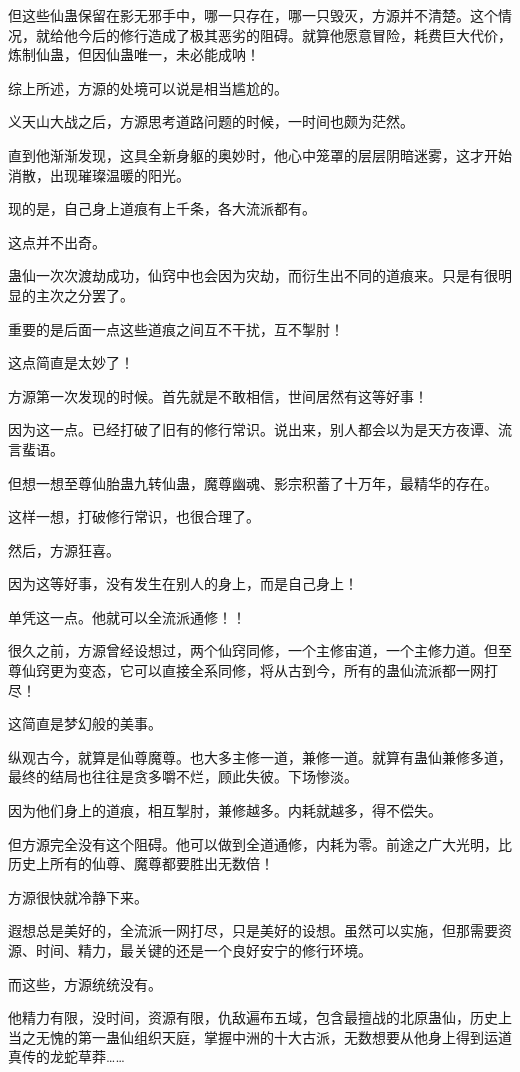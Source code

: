 \begin{this_body}
但这些仙蛊保留在影无邪手中，哪一只存在，哪一只毁灭，方源并不清楚。这个情况，就给他今后的修行造成了极其恶劣的阻碍。就算他愿意冒险，耗费巨大代价，炼制仙蛊，但因仙蛊唯一，未必能成呐！

综上所述，方源的处境可以说是相当尴尬的。

义天山大战之后，方源思考道路问题的时候，一时间也颇为茫然。

直到他渐渐发现，这具全新身躯的奥妙时，他心中笼罩的层层阴暗迷雾，这才开始消散，出现璀璨温暖的阳光。

现的是，自己身上道痕有上千条，各大流派都有。

这点并不出奇。

蛊仙一次次渡劫成功，仙窍中也会因为灾劫，而衍生出不同的道痕来。只是有很明显的主次之分罢了。

重要的是后面一点这些道痕之间互不干扰，互不掣肘！

这点简直是太妙了！

方源第一次发现的时候。首先就是不敢相信，世间居然有这等好事！

因为这一点。已经打破了旧有的修行常识。说出来，别人都会以为是天方夜谭、流言蜚语。

但想一想至尊仙胎蛊九转仙蛊，魔尊幽魂、影宗积蓄了十万年，最精华的存在。

这样一想，打破修行常识，也很合理了。

然后，方源狂喜。

因为这等好事，没有发生在别人的身上，而是自己身上！

单凭这一点。他就可以全流派通修！！

很久之前，方源曾经设想过，两个仙窍同修，一个主修宙道，一个主修力道。但至尊仙窍更为变态，它可以直接全系同修，将从古到今，所有的蛊仙流派都一网打尽！

这简直是梦幻般的美事。

纵观古今，就算是仙尊魔尊。也大多主修一道，兼修一道。就算有蛊仙兼修多道，最终的结局也往往是贪多嚼不烂，顾此失彼。下场惨淡。

因为他们身上的道痕，相互掣肘，兼修越多。内耗就越多，得不偿失。

但方源完全没有这个阻碍。他可以做到全道通修，内耗为零。前途之广大光明，比历史上所有的仙尊、魔尊都要胜出无数倍！

方源很快就冷静下来。

遐想总是美好的，全流派一网打尽，只是美好的设想。虽然可以实施，但那需要资源、时间、精力，最关键的还是一个良好安宁的修行环境。

而这些，方源统统没有。

他精力有限，没时间，资源有限，仇敌遍布五域，包含最擅战的北原蛊仙，历史上当之无愧的第一蛊仙组织天庭，掌握中洲的十大古派，无数想要从他身上得到运道真传的龙蛇草莽……


\end{this_body}
